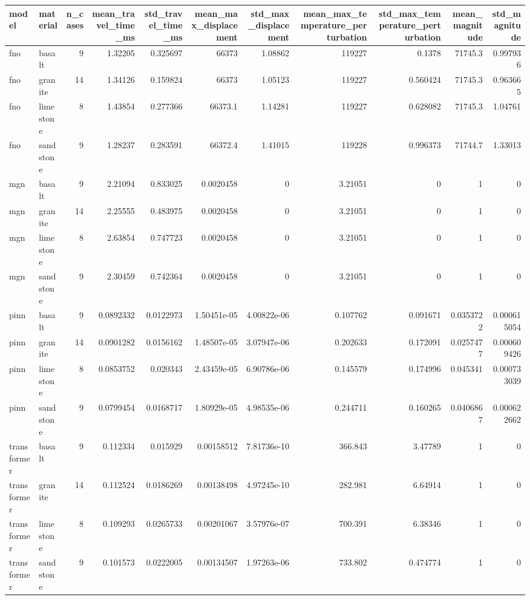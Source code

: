 \begin{tabular}{llrrrrrrrrr}
\toprule
model & material & n_cases & mean_travel_time_ms & std_travel_time_ms & mean_max_displacement & std_max_displacement & mean_max_temperature_perturbation & std_max_temperature_perturbation & mean_magnitude & std_magnitude \\
\midrule
fno & basalt & 9 & 1.32205 & 0.325697 & 66373 & 1.08862 & 119227 & 0.1378 & 71745.3 & 0.997936 \\
fno & granite & 14 & 1.34126 & 0.159824 & 66373 & 1.05123 & 119227 & 0.560424 & 71745.3 & 0.963665 \\
fno & limestone & 8 & 1.43854 & 0.277366 & 66373.1 & 1.14281 & 119227 & 0.628082 & 71745.3 & 1.04761 \\
fno & sandstone & 9 & 1.28237 & 0.283591 & 66372.4 & 1.41015 & 119228 & 0.996373 & 71744.7 & 1.33013 \\
mgn & basalt & 9 & 2.21094 & 0.833025 & 0.0020458 & 0 & 3.21051 & 0 & 1 & 0 \\
mgn & granite & 14 & 2.25555 & 0.483975 & 0.0020458 & 0 & 3.21051 & 0 & 1 & 0 \\
mgn & limestone & 8 & 2.63854 & 0.747723 & 0.0020458 & 0 & 3.21051 & 0 & 1 & 0 \\
mgn & sandstone & 9 & 2.30459 & 0.742364 & 0.0020458 & 0 & 3.21051 & 0 & 1 & 0 \\
pinn & basalt & 9 & 0.0892332 & 0.0122973 & 1.50451e-05 & 4.00822e-06 & 0.107762 & 0.091671 & 0.0353722 & 0.000615054 \\
pinn & granite & 14 & 0.0901282 & 0.0156162 & 1.48507e-05 & 3.07947e-06 & 0.202633 & 0.172091 & 0.0257477 & 0.000609426 \\
pinn & limestone & 8 & 0.0853752 & 0.020343 & 2.43459e-05 & 6.90786e-06 & 0.145579 & 0.174996 & 0.045341 & 0.000733039 \\
pinn & sandstone & 9 & 0.0799454 & 0.0168717 & 1.80929e-05 & 4.98535e-06 & 0.244711 & 0.160265 & 0.0406867 & 0.000622662 \\
transformer & basalt & 9 & 0.112334 & 0.015929 & 0.00158512 & 7.81736e-10 & 366.843 & 3.47789 & 1 & 0 \\
transformer & granite & 14 & 0.112524 & 0.0186269 & 0.00138498 & 4.97245e-10 & 282.981 & 6.64914 & 1 & 0 \\
transformer & limestone & 8 & 0.109293 & 0.0265733 & 0.00201067 & 3.57976e-07 & 700.391 & 6.38346 & 1 & 0 \\
transformer & sandstone & 9 & 0.101573 & 0.0222005 & 0.00134507 & 1.97263e-06 & 733.802 & 0.474774 & 1 & 0 \\
\bottomrule
\end{tabular}
